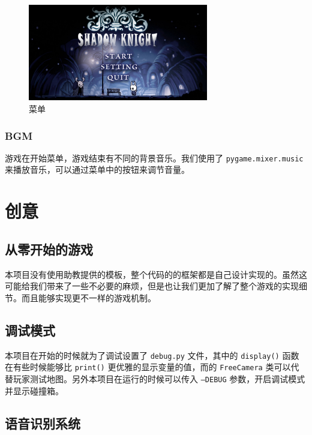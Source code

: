 \documentclass[12pt, twoside, a4paper]{article}
\newcommand{\inlinecode}[1]{\setlength{\fboxsep}{0.8mm} \colorbox{lightgray!40}{\texttt{#1}}}
\begin{document}
\begin{figure}[h!]
    \centering
    \includegraphics[width=0.7\textwidth]{assets/report/menu.png}
    \caption{菜单}
\end{figure}

\subsubsection{BGM}

游戏在开始菜单，游戏结束有不同的背景音乐。我们使用了 \inlinecode{pygame.mixer.music} 来播放音乐，可以通过菜单中的按钮来调节音量。

\section{创意}

\subsection{从零开始的游戏}

本项目没有使用助教提供的模板，整个代码的的框架都是自己设计实现的。虽然这可能给我们带来了一些不必要的麻烦，但是也让我们更加了解了整个游戏的实现细节。而且能够实现更不一样的游戏机制。

\subsection{调试模式}

本项目在开始的时候就为了调试设置了 \inlinecode{debug.py} 文件，其中的 \inlinecode{display()} 函数在有些时候能够比 \inlinecode{print()} 更优雅的显示变量的值，而的 \inlinecode{FreeCamera} 类可以代替玩家测试地图。另外本项目在运行的时候可以传入 \inlinecode{--DEBUG} 参数，开启调试模式并显示碰撞箱。

\subsection{语音识别系统}
\end{document}
